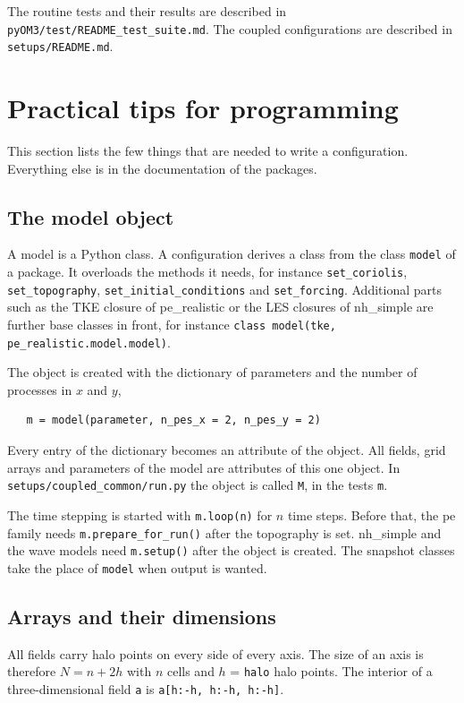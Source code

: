 \documentclass[12pt]{article}
\begin{document}
The routine tests and their results are described in \verb|pyOM3/test/README_test_suite.md|.
The coupled configurations are described in \verb|setups/README.md|.

{}
\section*{Practical tips for programming}

This section lists the few things that are needed to write a configuration.
Everything else is in the documentation of the packages.

\subsection*{The model object}

A model is a Python class.
A configuration derives a class from the class \verb|model| of a package.
It overloads the methods it needs, for instance \verb|set_coriolis|, \verb|set_topography|, \verb|set_initial_conditions| and \verb|set_forcing|.
Additional parts such as the TKE closure of pe\_realistic or the LES closures of nh\_simple are further base classes in front, for instance \verb|class model(tke, pe_realistic.model.model)|.

The object is created with the dictionary of parameters and the number of processes in $x$ and $y$,
\begin{verbatim}
   m = model(parameter, n_pes_x = 2, n_pes_y = 2)
\end{verbatim}
Every entry of the dictionary becomes an attribute of the object.
All fields, grid arrays and parameters of the model are attributes of this one object.
In \verb|setups/coupled_common/run.py| the object is called \verb|M|, in the tests \verb|m|.

The time stepping is started with \verb|m.loop(n)| for $n$ time steps.
Before that, the pe family needs \verb|m.prepare_for_run()| after the topography is set.
nh\_simple and the wave models need \verb|m.setup()| after the object is created.
The snapshot classes take the place of \verb|model| when output is wanted.

\subsection*{Arrays and their dimensions}

All fields carry halo points on every side of every axis.
The size of an axis is therefore $N = n + 2 h$ with $n$ cells and $h$ = \verb|halo| halo points.
The interior of a three-dimensional field \verb|a| is \verb|a[h:-h, h:-h, h:-h]|.
\end{document}

